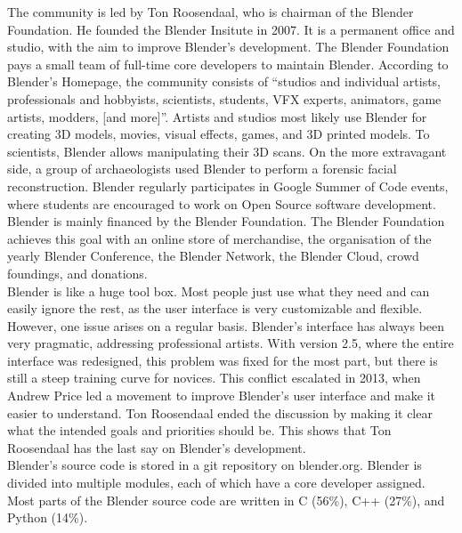 The community is led by Ton Roosendaal, who is chairman of the Blender Foundation. He founded the Blender Insitute in 2007. It is a permanent office and studio, with the aim to improve Blender's development.\cite{blender-foundation-history} The Blender Foundation pays a small team of full-time core developers to maintain Blender.\cite{blender-development-support} According to Blender's Homepage\cite{blender-homepage}, the community consists of ``studios and individual artists, professionals and hobbyists, scientists, students, VFX experts, animators, game artists, modders, [and more]''. Artists and studios most likely use Blender for creating 3D models, movies, visual effects, games, and 3D printed models. To scientists, Blender allows manipulating their 3D scans. On the more extravagant side, a group of archaeologists used Blender to perform a forensic facial reconstruction.\cite{blender-facial-reconstruction} Blender regularly participates in Google Summer of Code events, where students are encouraged to work on Open Source software development.\cite{blender-gsoc-2016} \\

Blender is mainly financed by the Blender Foundation. The Blender Foundation achieves this goal with an online store\cite{blender-estore} of merchandise, the organisation of the yearly Blender Conference\cite{blender-conference}, the Blender Network\cite{blender-network}, the Blender Cloud\cite{blender-cloud}, crowd foundings, and donations\cite{blender-donate}. \\

Blender is like a huge tool box. Most people just use what they need and can easily ignore the rest, as the user interface is very customizable and flexible. However, one issue arises on a regular basis. Blender's interface has always been very pragmatic, addressing professional artists. With version 2.5, where the entire interface was redesigned, this problem was fixed for the most part, but there is still a steep training curve for novices. This conflict escalated in 2013, when Andrew Price led a movement to improve Blender's user interface and make it easier to understand.\cite{blender-guru-ui} Ton Roosendaal ended the discussion by making it clear what the intended goals and priorities should be.\cite{blender-ton-ui} This shows that Ton Roosendaal has the last say on Blender's development. \\

Blender's source code is stored in a git repository on blender.org\cite{blender-repository}. Blender is divided into multiple modules, each of which have a core developer assigned.\cite{blender-module-owners} Most parts of the Blender source code are written in C (56\%), C++ (27\%), and Python (14\%).\cite{blender-code-stat} \\

